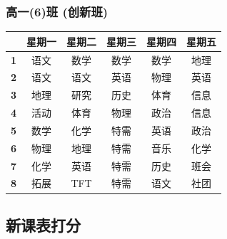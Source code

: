 \documentclass[a4paper]{article}
\begin{document}
  \subsubsection{高一(6)班 (创新班)}
   \begin{tabular}{|c|c|c|c|c|c|}
   \hline
   & \bf 星期一 & \bf 星期二 & \bf 星期三 & \bf 星期四 & \bf 星期五 \\\hline
   \bf 1 & 语文 & 数学 & 数学 & 数学 & 地理 \\\hline
   \bf 2 & 语文 & 语文 & 英语 & 物理 & 英语 \\\hline
   \bf 3 & 地理 & 研究 & 历史 & 体育 & 信息 \\\hline
   \bf 4 & 活动 & 体育 & 物理 & 政治 & 信息 \\\hline
   \bf 5 & 数学 & 化学 & 特需 & 英语 & 政治 \\\hline
   \bf 6 & 物理 & 地理 & 特需 & 音乐 & 化学 \\\hline
   \bf 7 & 化学 & 英语 & 特需 & 历史 & 班会 \\\hline
   \bf 8 & 拓展 & TFT  & 特需 & 语文 & 社团 \\\hline
   \end{tabular}
 \clearpage
 \subsection{新课表打分}
\end{document}
